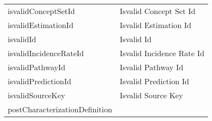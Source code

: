 \documentclass[
]{article}
\begin{document}
\begin{longtable}[]{@{}ll@{}}
\begin{minipage}[t]{0.46\columnwidth}\raggedright
isvalidConceptSetId\strut
\end{minipage} & \begin{minipage}[t]{0.48\columnwidth}\raggedright
Isvalid Concept Set Id\strut
\end{minipage}\tabularnewline
\begin{minipage}[t]{0.46\columnwidth}\raggedright
isvalidEstimationId\strut
\end{minipage} & \begin{minipage}[t]{0.48\columnwidth}\raggedright
Isvalid Estimation Id\strut
\end{minipage}\tabularnewline
\begin{minipage}[t]{0.46\columnwidth}\raggedright
isvalidId\strut
\end{minipage} & \begin{minipage}[t]{0.48\columnwidth}\raggedright
Isvalid Id\strut
\end{minipage}\tabularnewline
\begin{minipage}[t]{0.46\columnwidth}\raggedright
isvalidIncidenceRateId\strut
\end{minipage} & \begin{minipage}[t]{0.48\columnwidth}\raggedright
Isvalid Incidence Rate Id\strut
\end{minipage}\tabularnewline
\begin{minipage}[t]{0.46\columnwidth}\raggedright
isvalidPathwayId\strut
\end{minipage} & \begin{minipage}[t]{0.48\columnwidth}\raggedright
Isvalid Pathway Id\strut
\end{minipage}\tabularnewline
\begin{minipage}[t]{0.46\columnwidth}\raggedright
isvalidPredictionId\strut
\end{minipage} & \begin{minipage}[t]{0.48\columnwidth}\raggedright
Isvalid Prediction Id\strut
\end{minipage}\tabularnewline
\begin{minipage}[t]{0.46\columnwidth}\raggedright
isvalidSourceKey\strut
\end{minipage} & \begin{minipage}[t]{0.48\columnwidth}\raggedright
Isvalid Source Key\strut
\end{minipage}\tabularnewline
\begin{minipage}[t]{0.46\columnwidth}\raggedright
postCharacterizationDefinition\strut

\end{minipage}
\end{longtable}
\end{document}
